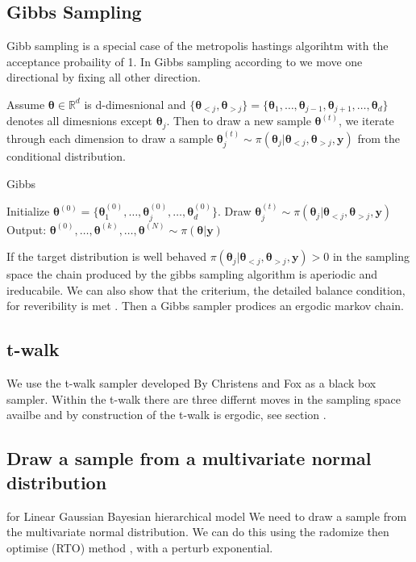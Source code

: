 \subsection{Gibbs Sampling}
Gibb sampling is a special case of the metropolis hastings algorihtm with the acceptance probaility of 1.
In Gibbs sampling according to \cite{} we move one directional by fixing all other direction.

Assume $\bm{\theta} \in \mathbb{R}^d$ is d-dimesnional and $\{\bm{\theta}_{<j}, \bm{\theta}_{>j} \}  = \{\bm{\theta}_{1}, \dots, \bm{\theta}_{j-1}, \bm{\theta}_{j+1}, \dots, \bm{\theta}_{d} \} $ denotes all dimesnions except $ \bm{\theta}_{j}$.
Then to draw a new sample $\bm{\theta}^{(t)}$, we iterate through each dimension to draw a sample $\bm{\theta}_j^{(t)} \sim  \pi(\bm{\theta}_j | \bm{\theta}_{<j}, \bm{\theta}_{>j} , \bm{y} )$ from the conditional distribution.

\begin{algorithm}
	\caption{Gibbs}
	\begin{algorithmic}[1]
		\STATE Initialize \( \bm{\theta}^{(0)} = \{\bm{\theta}^{(0)}_{1}, \dots, \bm{\theta}^{(0)}_{j},\dots,\bm{\theta}^{(0)}_{d} \} \).
		\STATE Draw \(\bm{\theta}_j^{(t)} \sim  \pi(\bm{\theta}_j | \bm{\theta}_{<j}, \bm{\theta}_{>j} , \bm{y} )\) 
		\ENDFOR
		\ENDFOR
		\STATE Output: $ \bm{\theta}^{(0)}, \dots,  \bm{\theta}^{(k)} , \dots,   \bm{\theta}^{(N)} \sim \pi(\bm{\theta}| \bm{y}) $
	\end{algorithmic}
\end{algorithm}

If the target distribution is well behaved $\pi(\bm{\theta}_j | \bm{\theta}_{<j}, \bm{\theta}_{>j} , \bm{y} ) > 0$ in the sampling space the chain produced by the gibbs sampling algorithm is aperiodic and ireducabile.
We can also show that the criterium, the detailed balance condition, for reveribility is met \cite{}.
Then a Gibbs sampler prodices an ergodic markov chain.


\subsection{t-walk}
We use the t-walk sampler developed By Christens and Fox as a black box sampler\cite{}.
Within the t-walk there are three differnt moves in the sampling space availbe and by construction of the t-walk is ergodic, see section \cite{}.


\subsection{Draw a sample from a multivariate normal distribution}
for Linear Gaussian Bayesian hierarchical model We need to draw a sample from the multivariate normal distribution.
We can do this using the radomize then optimise (RTO) method \cite{}, with a perturb exponential.

